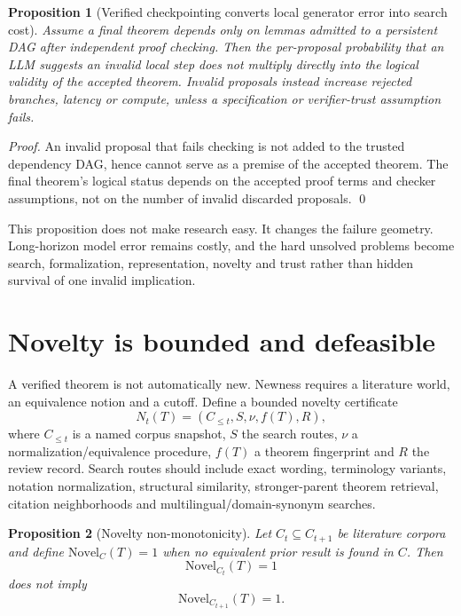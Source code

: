 \documentclass[11pt]{article}
\newtheorem{proposition}{Proposition}
\begin{document}
\begin{proposition}[Verified checkpointing converts local generator error into search cost]
Assume a final theorem depends only on lemmas admitted to a persistent DAG after independent proof checking. Then the per-proposal probability that an LLM suggests an invalid local step does not multiply directly into the logical validity of the accepted theorem. Invalid proposals instead increase rejected branches, latency or compute, unless a specification or verifier-trust assumption fails.
\end{proposition}

\begin{proof}
An invalid proposal that fails checking is not added to the trusted dependency DAG, hence cannot serve as a premise of the accepted theorem. The final theorem's logical status depends on the accepted proof terms and checker assumptions, not on the number of invalid discarded proposals. \qed
\end{proof}

This proposition does not make research easy. It changes the failure geometry. Long-horizon model error remains costly, and the hard unsolved problems become search, formalization, representation, novelty and trust rather than hidden survival of one invalid implication.

\section{Novelty is bounded and defeasible}

A verified theorem is not automatically new. Newness requires a literature world, an equivalence notion and a cutoff. Define a bounded novelty certificate
\[
N_t(T)=(C_{\le t},S,\nu,f(T),R),
\]
where $C_{\le t}$ is a named corpus snapshot, $S$ the search routes, $\nu$ a normalization/equivalence procedure, $f(T)$ a theorem fingerprint and $R$ the review record. Search routes should include exact wording, terminology variants, notation normalization, structural similarity, stronger-parent theorem retrieval, citation neighborhoods and multilingual/domain-synonym searches.

\begin{proposition}[Novelty non-monotonicity]
Let $C_t\subseteq C_{t+1}$ be literature corpora and define $\mathrm{Novel}_{C}(T)=1$ when no equivalent prior result is found in $C$. Then
\[
\mathrm{Novel}_{C_t}(T)=1
\]
does not imply
\[
\mathrm{Novel}_{C_{t+1}}(T)=1.
\]
\end{proposition}
\end{document}
